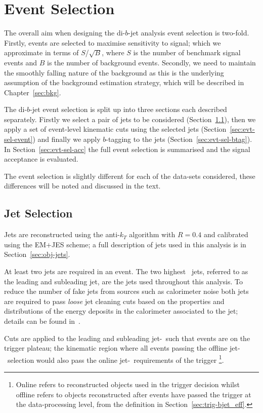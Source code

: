 \section{Event Selection}
\label{sec:evt-sel}

The overall aim when designing the di-$b$-jet analysis event selection
is two-fold.
Firstly, events are selected to
maximise sensitivity to signal;
which we approximate in terms of $S$/$\sqrt{B}$,
where $S$ is the number of benchmark signal events and $B$ is the number of background events.
Secondly, we need to maintain the smoothly falling nature of the background
as this is the underlying assumption of the background estimation strategy,
which will be described in Chapter~\ref{sec:bkg}.

The di-$b$-jet event selection is split up into three sections each described separately.
Firstly we select a pair of jets to be considered (Section~\ref{sec:evt-sel-jets}),
then we apply a set of event-level kinematic cuts using the selected jets (Section~\ref{sec:evt-sel-event})
and finally we apply $b$-tagging to the jets (Section~\ref{sec:evt-sel-btag}).
In Section~\ref{sec:evt-sel-acc} the full event selection is summarised and
the signal acceptance is evaluated.

The event selection is slightly different for each of the data-sets considered,
these differences will be noted and discussed in the text.

\subsection{Jet Selection}
\label{sec:evt-sel-jets}

Jets are reconstructed using the anti-$k_T$ algorithm with $R=0.4$
and calibrated using the EM+JES scheme;
a full description of jets used in this analysis is in Section~\ref{sec:obj-jets}.

At least two jets are required in an event.
The two highest \pT~jets, referred to as the leading and subleading jet,
are the jets used throughout this analysis.
To reduce the number of fake jets from sources such as calorimeter noise
both jets are required to pass \textit{loose} jet cleaning cuts
based on the properties and distributions of the energy deposits in the calorimeter associated to the jet;
details can be found in~\cite{evt-jet_cleaning}.

Cuts are applied to the leading and subleading jet-\pT~such that events are on the trigger plateau;
the kinematic region where all events passing the offline jet-\pT~selection
would also pass the online jet-\pT~requirements of the trigger
\footnote{Online refers to reconstructed objects used in the trigger decision
  whilst offline refers to objects reconstructed after events have passed the trigger at the data-processing level,
  from the definition in Section~\ref{sec:trig-bjet_eff}.}.


